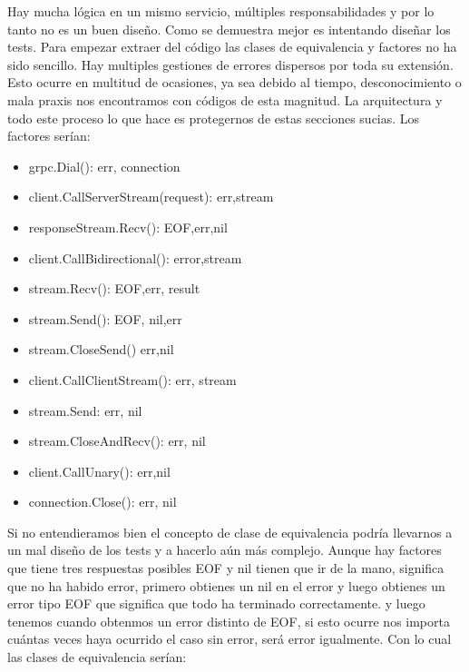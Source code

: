 Hay mucha lógica en un mismo servicio, múltiples responsabilidades y por lo tanto no es un buen diseño.
Como se demuestra mejor es intentando diseñar los tests.
Para empezar extraer del código las clases de equivalencia y factores no ha sido sencillo.
Hay multiples gestiones de errores dispersos por toda su extensión.
Esto ocurre en multitud de ocasiones, ya sea debido al tiempo, desconocimiento o mala praxis nos encontramos con códigos de esta magnitud.
La arquitectura y todo este proceso lo que hace es protegernos de estas secciones sucias.
Los factores serían:

\begin{itemize}
    \item grpc.Dial(): err, connection
    \item client.CallServerStream(request): err,stream
    \item responseStream.Recv(): EOF,err,nil
    \item client.CallBidirectional(): error,stream
    \item stream.Recv(): EOF,err, result
    \item stream.Send(): EOF, nil,err
    \item stream.CloseSend() err,nil
    \item client.CallClientStream(): err, stream
    \item stream.Send: err, nil
    \item stream.CloseAndRecv(): err, nil
    \item client.CallUnary(): err,nil
    \item connection.Close(): err, nil
\end{itemize}

Si no entendieramos bien el concepto de clase de equivalencia podría llevarnos a un mal diseño de los tests y a hacerlo aún más complejo.
Aunque hay factores que tiene tres respuestas posibles EOF y nil tienen que ir de la mano, significa que no ha habido error, primero obtienes un nil en el error y luego obtienes un error tipo EOF que significa que todo ha terminado correctamente.
y luego tenemos cuando obtenmos un error distinto de EOF, si esto ocurre nos importa cuántas veces haya ocurrido el caso sin error, será error igualmente.
Con lo cual las clases de equivalencia serían:

